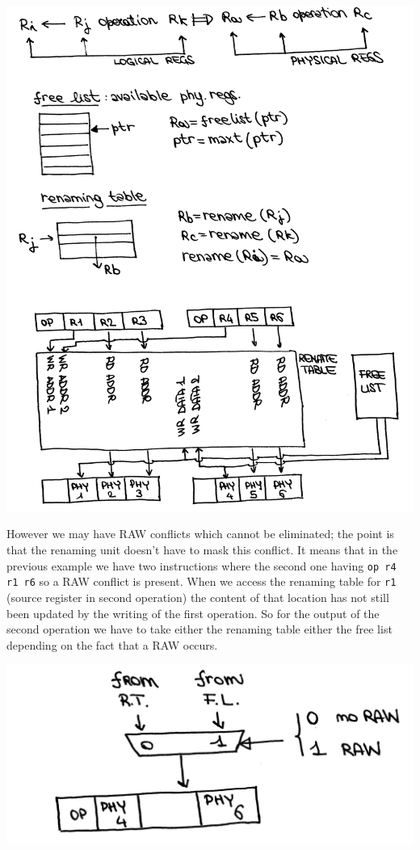 \begin{center}
  \includegraphics[width=1.0\linewidth]{img/img3/26}
\end{center}



However we may have RAW conflicts which cannot be eliminated; the point is that the renaming unit doesn't have to mask this conflict. It means that in the previous example we have two instructions where the second one having \verb|op r4 r1 r6| so a RAW conflict is present. When we access the renaming table for \verb|r1| (source register in second operation) the content of that location has not still been updated by the writing of the first operation. So for the output of the second operation we have to take either the renaming table either the free list depending on the fact that a RAW occurs.

\begin{center}
  \includegraphics[width=0.7\linewidth]{img/img3/27}
\end{center}

